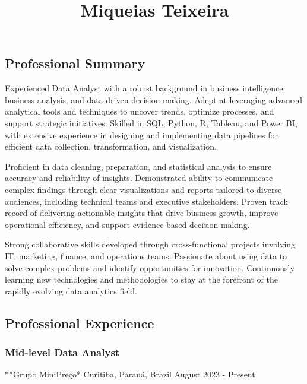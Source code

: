 \documentclass[
]{article}
\title{Miqueias Teixeira}
\author{}
\date{\vspace{-2.5em}}
\begin{document}
\maketitle

\subsection{Professional Summary}\label{professional-summary}

Experienced Data Analyst with a robust background in business
intelligence, business analysis, and data-driven decision-making. Adept
at leveraging advanced analytical tools and techniques to uncover
trends, optimize processes, and support strategic initiatives. Skilled
in SQL, Python, R, Tableau, and Power BI, with extensive experience in
designing and implementing data pipelines for efficient data collection,
transformation, and visualization.

Proficient in data cleaning, preparation, and statistical analysis to
ensure accuracy and reliability of insights. Demonstrated ability to
communicate complex findings through clear visualizations and reports
tailored to diverse audiences, including technical teams and executive
stakeholders. Proven track record of delivering actionable insights that
drive business growth, improve operational efficiency, and support
evidence-based decision-making.

Strong collaborative skills developed through cross-functional projects
involving IT, marketing, finance, and operations teams. Passionate about
using data to solve complex problems and identify opportunities for
innovation. Continuously learning new technologies and methodologies to
stay at the forefront of the rapidly evolving data analytics field.

\subsection{Professional Experience}\label{professional-experience}

\subsubsection{Mid-level Data Analyst}\label{mid-level-data-analyst}

**Grupo MiniPreço* \textbar{} Curitiba, Paraná, Brazil \textbar{} August
2023 - Present
\end{document}
